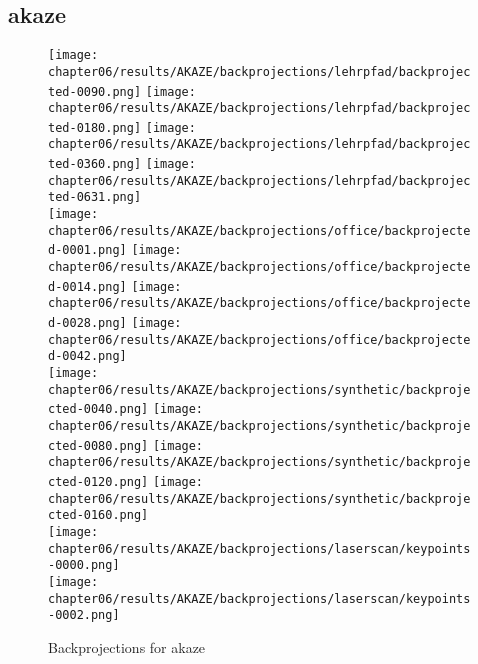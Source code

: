 \subsection{\acrshort{akaze}}\label{sec:lehrpfad_conversions}
\begin{figure}[H]
    \texttt{[image: chapter06/results/AKAZE/backprojections/lehrpfad/backprojected-0090.png]}%
    \texttt{[image: chapter06/results/AKAZE/backprojections/lehrpfad/backprojected-0180.png]}%
    \texttt{[image: chapter06/results/AKAZE/backprojections/lehrpfad/backprojected-0360.png]}%
    \texttt{[image: chapter06/results/AKAZE/backprojections/lehrpfad/backprojected-0631.png]}\\
    \texttt{[image: chapter06/results/AKAZE/backprojections/office/backprojected-0001.png]}%
    \texttt{[image: chapter06/results/AKAZE/backprojections/office/backprojected-0014.png]}%
    \texttt{[image: chapter06/results/AKAZE/backprojections/office/backprojected-0028.png]}%
    \texttt{[image: chapter06/results/AKAZE/backprojections/office/backprojected-0042.png]}\\
    \texttt{[image: chapter06/results/AKAZE/backprojections/synthetic/backprojected-0040.png]}%
    \texttt{[image: chapter06/results/AKAZE/backprojections/synthetic/backprojected-0080.png]}%
    \texttt{[image: chapter06/results/AKAZE/backprojections/synthetic/backprojected-0120.png]}%
    \texttt{[image: chapter06/results/AKAZE/backprojections/synthetic/backprojected-0160.png]}\\
    \texttt{[image: chapter06/results/AKAZE/backprojections/laserscan/keypoints-0000.png]}\\
    \texttt{[image: chapter06/results/AKAZE/backprojections/laserscan/keypoints-0002.png]}\\
    \caption{Backprojections for \acrshort{akaze}}
\end{figure}
